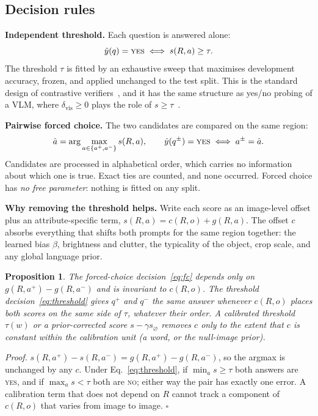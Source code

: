 \documentclass[11pt]{article}
\newcommand{\yes}{\textsc{yes}}
\newcommand{\no}{\textsc{no}}
\newtheorem{proposition}{Proposition}
\begin{document}
\subsection{Decision rules}\label{sec:decision}
\textbf{Independent threshold.} Each question is answered alone:
\begin{equation}
\hat y(q)=\yes \iff s(R,a)\ge\tau .
\label{eq:threshold}
\end{equation}
The threshold $\tau$ is fitted by an exhaustive sweep that maximises development accuracy, frozen, and applied unchanged to the test split. This is the standard design of contrastive verifiers~\cite{hessel2021clipscore}, and it has the same structure as yes/no probing of a VLM, where $\delta_{\mathrm{vis}}\ge 0$ plays the role of $s\ge\tau$~\cite{zhang2026visor}.

\textbf{Pairwise forced choice.} The two candidates are compared on the same region:
\begin{equation}
\hat a=\arg\max_{a\in\{a^{+},a^{-}\}} s(R,a),\qquad \hat y(q^{\pm})=\yes \iff a^{\pm}=\hat a .
\label{eq:fc}
\end{equation}
Candidates are processed in alphabetical order, which carries no information about which one is true. Exact ties are counted, and none occurred. Forced choice has \emph{no free parameter}: nothing is fitted on any split.

\textbf{Why removing the threshold helps.} Write each score as an image-level offset plus an attribute-specific term, $s(R,a)=c(R,o)+g(R,a)$. The offset $c$ absorbs everything that shifts both prompts for the same region together: the learned bias $\beta$, brightness and clutter, the typicality of the object, crop scale, and any global language prior.

\begin{proposition}\label{prop:offset}
The forced-choice decision~\eqref{eq:fc} depends only on $g(R,a^{+})-g(R,a^{-})$ and is invariant to $c(R,o)$. The threshold decision~\eqref{eq:threshold} gives $q^{+}$ and $q^{-}$ the same answer whenever $c(R,o)$ places both scores on the same side of $\tau$, whatever their order. A calibrated threshold $\tau(w)$ or a prior-corrected score $s-\gamma s_{\varnothing}$ removes $c$ only to the extent that $c$ is constant within the calibration unit (a word, or the null-image prior).
\end{proposition}
\noindent\emph{Proof.} $s(R,a^{+})-s(R,a^{-})=g(R,a^{+})-g(R,a^{-})$, so the argmax is unchanged by any $c$. Under Eq.~\eqref{eq:threshold}, if $\min_a s\ge\tau$ both answers are \yes, and if $\max_a s<\tau$ both are \no; either way the pair has exactly one error. A calibration term that does not depend on $R$ cannot track a component of $c(R,o)$ that varies from image to image. $\square$
\end{document}
